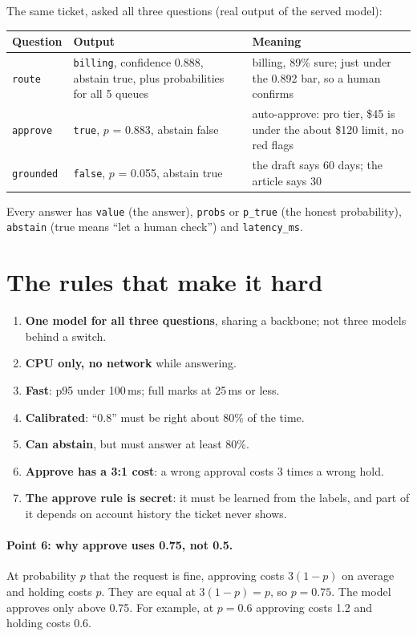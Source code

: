 \documentclass[11pt,a4paper]{article}
\begin{document}
\medskip
\noindent The same ticket, asked all three questions (real output of the served model):

\medskip
\noindent\begin{tabularx}{\linewidth}{@{}lp{4.6cm}L@{}}
\toprule
Question & Output & Meaning \\
\midrule
\texttt{route} & \texttt{billing}, confidence 0.888, abstain true, plus probabilities for all 5 queues & billing, 89\% sure; just under the 0.892 bar, so a human confirms \\
\texttt{approve} & \texttt{true}, $p$ = 0.883, abstain false & auto-approve: pro tier, \$45 is under the about \$120 limit, no red flags \\
\texttt{grounded} & \texttt{false}, $p$ = 0.055, abstain true & the draft says 60 days; the article says 30 \\
\bottomrule
\end{tabularx}

\medskip
\noindent Every answer has \texttt{value} (the answer), \texttt{probs} or \texttt{p\_true}
(the honest probability), \texttt{abstain} (true means ``let a human check'') and
\texttt{latency\_ms}.

\section{The rules that make it hard}
\begin{enumerate}
  \item \textbf{One model for all three questions}, sharing a backbone; not three models behind a switch.
  \item \textbf{CPU only, no network} while answering.
  \item \textbf{Fast}: p95 under 100\,ms; full marks at 25\,ms or less.
  \item \textbf{Calibrated}: ``0.8'' must be right about 80\% of the time.
  \item \textbf{Can abstain}, but must answer at least 80\%.
  \item \textbf{Approve has a 3:1 cost}: a wrong approval costs 3 times a wrong hold.
  \item \textbf{The approve rule is secret}: it must be learned from the labels, and part of it depends on account history the ticket never shows.
\end{enumerate}

\paragraph{Point 6: why approve uses 0.75, not 0.5.} At probability $p$ that the request
is fine, approving costs $3(1-p)$ on average and holding costs $p$. They are equal at
$3(1-p) = p$, so $p = 0.75$. The model approves only above 0.75. For example, at $p = 0.6$
approving costs 1.2 and holding costs 0.6.
\end{document}
